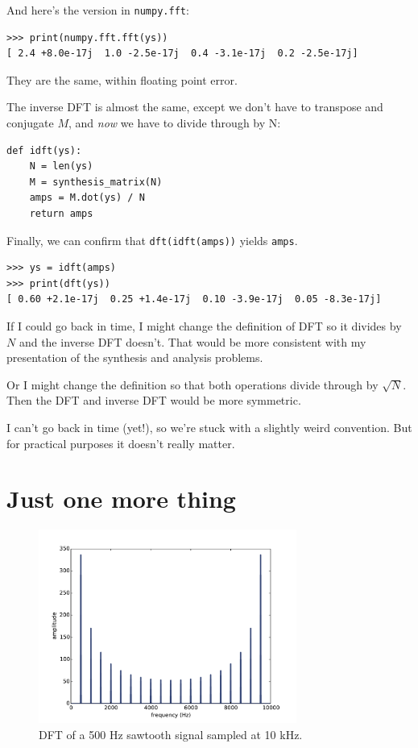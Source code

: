 \documentclass[12pt]{book}
\begin{document}
And here's the version in {\tt numpy.fft}:

\begin{verbatim}
>>> print(numpy.fft.fft(ys))
[ 2.4 +8.0e-17j  1.0 -2.5e-17j  0.4 -3.1e-17j  0.2 -2.5e-17j]
\end{verbatim}

They are the same, within floating point error.

The inverse DFT is almost the same, except we don't have to transpose and
conjugate $M$, and
{\em now} we have to
divide through by N:

\begin{verbatim}
def idft(ys):
    N = len(ys)
    M = synthesis_matrix(N)
    amps = M.dot(ys) / N
    return amps
\end{verbatim}

Finally, we can confirm that {\tt dft(idft(amps))} yields {\tt amps}.

\begin{verbatim}
>>> ys = idft(amps)
>>> print(dft(ys))
[ 0.60 +2.1e-17j  0.25 +1.4e-17j  0.10 -3.9e-17j  0.05 -8.3e-17j]
\end{verbatim}

If I could go back in time, I might change the definition of
DFT so it divides by $N$ and the inverse DFT doesn't.  That would
be more consistent with my presentation of the synthesis and analysis
problems.

Or I might change the definition so that both operations divide
through by $\sqrt{N}$.  Then the DFT and inverse DFT would be
more symmetric.

I can't go back in time (yet!), so we're stuck with a slightly
weird convention.  But for practical purposes it doesn't really
matter.


\section{Just one more thing}

\begin{figure}
\centerline{\includegraphics[height=2.5in]{figs/dft3.pdf}}
\caption{DFT of a 500 Hz sawtooth signal sampled at 10 kHz.}
\label{fig.dft3}
\end{figure}
\end{document}
